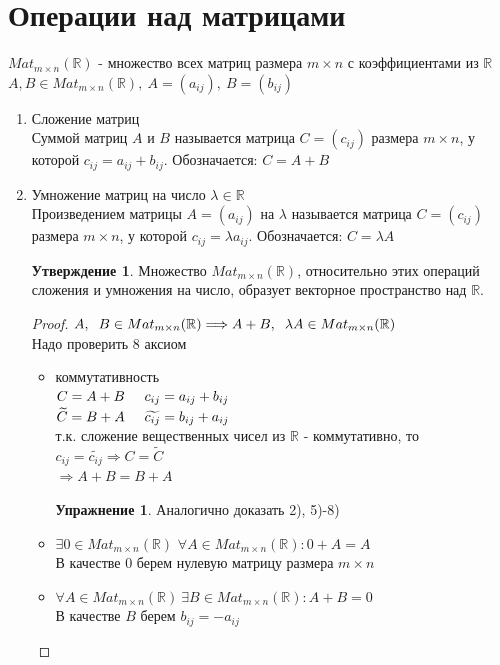 \documentclass[a4paper, 12pt]{article}
\newcommand{\R}{\mathbb R}
\newcommand\tab[1][.5cm]{\hspace*{#1}}
\theoremstyle{definition}
\newtheorem*{subtheorem}{Утверждение}
\newtheorem*{Exercise}{Упражнение}
\begin{document}
  \section{Операции над матрицами}
  $Mat_{m \times n}(\R)$ - множество всех матриц размера $m \times n$ с коэффициентами из $\R$ \\
  $A, B \in Mat_{m \times n}(\R), \ A=(a_{ij}), \ B=(b_{ij})$ 
  \begin{enumerate}
    \item Сложение матриц \\
    Суммой матриц $A$ и $B$ называется матрица $C=(c_{ij})$ размера $m \times n$, у которой $c_{ij} = a_{ij} + b_{ij}$. Обозначается: $C = A + B$
    \item Умножение матриц на число $\lambda \in \R$ \\ Произведением матрицы $A=(a_{ij})$ на $\lambda$ называется матрица $C=(c_{ij})$ размера $m \times n$, у которой $c_{ij} = \lambda a_{ij}$. Обозначается: $C = \lambda A$
    \begin{subtheorem}
      Множество $Mat_{m \times n}(\R)$, относительно этих операций сложения и умножения на число, образует векторное пространство над $\R$. 
    \end{subtheorem} 
    \begin{proof}
      $A,\tab [0.2cm]B \in Mat_{m \times n}(\R) \Longrightarrow A+B, \tab [0.2cm]\lambda A \in Mat_{m \times n}(\R)$ \\
      Надо проверить 8 аксиом
      \begin{itemize}
        \item[1)] коммутативность \\
        $C = A + B \tab[0.5cm] c_{ij} = a_{ij} + b_{ij}$ \\
        $\widetilde{C} = B + A \tab[0.5cm] \widetilde{c_{ij}} = b_{ij} + a_{ij}$ \\
        т.к. сложение вещественных чисел из $\R$ - коммутативно, то $c_{ij} = \widetilde{c_{ij}} \Longrightarrow C = \widetilde{C}$ \\
        $\Longrightarrow A + B = B + A$
        \begin{Exercise} Аналогично доказать 2), 5)-8)\end{Exercise}
        \item[3)] $\exists 0 \in Mat_{m \times n}(\R)$
        $\forall A \in Mat_{m \times n}(\R): 0 + A = A$ \\
        В качестве 0 берем нулевую матрицу размера $m \times n$
        \item[4)] $\forall A \in Mat_{m \times n}(\R) \ \exists B \in Mat_{m \times n}(\R): A+B=0$ \\В качестве $B$ берем $b_{ij} = -a_{ij}$ 

\end{itemize}
\end{proof}
\end{enumerate}
\end{document}
